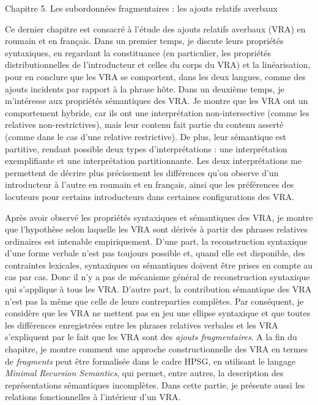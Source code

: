 Chapitre 5. Les subordonnées fragmentaires : les ajouts relatifs averbaux

Ce dernier chapitre est consacré à l'étude des ajouts relatifs averbaux (VRA) en roumain et en français. Dans un premier temps, je discute leurs propriétés syntaxiques, en regardant la constituance (en particulier, les propriétés distributionnelles de l'introducteur et celles du corps du VRA) et la linéarisation, pour en conclure que les VRA se comportent, dans les deux langues, comme des ajouts incidents par rapport à la phrase hôte. Dans un deuxième temps, je m'intéresse aux propriétés sémantiques des VRA. Je montre que les VRA ont un comportement hybride, car ils ont une interprétation non-intersective (comme les relatives non-restrictives), mais leur contenu fait partie du contenu asserté (comme dans le cas d'une relative restrictive). De plus, leur sémantique est partitive, rendant possible deux types d'interprétations : une interprétation exemplifiante et une interprétation partitionnante. Les deux interprétations me permettent de décrire plus précisement les différences qu'on observe d'un introducteur à l'autre en roumain et en français, ainsi que les préférences des locuteurs pour certains introducteurs dans certaines configurations des VRA.

Après avoir observé les propriétés syntaxiques et sémantiques des VRA, je montre que l'hypothèse selon laquelle les VRA sont dérivés à partir des phrases relatives ordinaires est intenable empiriquement. D'une part, la reconstruction syntaxique d'une forme verbale n'est pas toujours possible et, quand elle est disponible, des contraintes lexicales, syntaxiques ou sémantiques doivent être prises en compte au cas par cas. Donc il n'y a pas de mécanisme général de reconstruction syntaxique qui s'applique à tous les VRA. D'autre part, la contribution sémantique des VRA n'est pas la même que celle de leurs contreparties complètes. Par conséquent, je considère que les VRA ne mettent pas en jeu une ellipse syntaxique et que toutes les différences enregistrées entre les phrases relatives verbales et les VRA s'expliquent par le fait que les VRA sont des \textit{ajouts fragmentaires}. A la fin du chapitre, je montre comment une approche constructionnelle des VRA en termes de \textit{fragments} peut être formalisée dans le cadre HPSG, en utilisant le langage \textit{Minimal Recursion Semantics}, qui permet, entre autres, la description des représentations sémantiques incomplètes. Dans cette partie, je présente aussi les relations fonctionnelles à l'intérieur d'un VRA.

